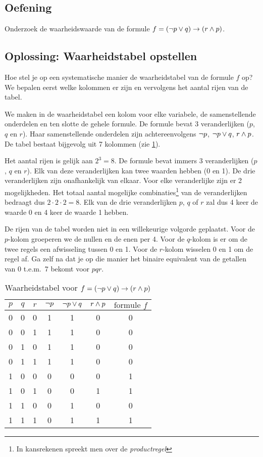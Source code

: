 \subsection{Oefening}
Onderzoek de waarheidswaarde van de formule $f = (\neg p \vee q) \rightarrow (r \wedge p)$.\\

\subsection*{Oplossing: Waarheidstabel opstellen}
Hoe stel je op een systematische manier de waarheidstabel van de formule $f$ op? We bepalen eerst welke kolommen er zijn en vervolgens het aantal rijen van de tabel.

We maken in de waarheidstabel een kolom voor elke variabele, de samenstellende onderdelen en ten slotte de gehele formule. De formule bevat 3 veranderlijken ($p$, $q$ en $r$). Haar samenstellende onderdelen zijn achtereenvolgens $\neg p$, $\neg p \vee q$, $r \wedge p$. De tabel bestaat bijgevolg uit 7 kolommen (zie \cref{tbl:oefdrievar}).

Het aantal rijen is gelijk aan $2^3=8$.  De formule bevat immers 3 veranderlijken ($p$, $q$ en $r$). Elk van deze veranderlijken kan twee waarden hebben (0 en 1). De drie veranderlijken zijn onafhankelijk van elkaar. Voor elke veranderlijke zijn er 2 mogelijkheden. Het totaal aantal mogelijke combinaties\footnote{In kansrekenen spreekt men over de \emph{productregel}} van de veranderlijken bedraagt dus $2 \cdot 2 \cdot 2 = 8$. Elk van de drie veranderlijken $p$, $q$ of $r$ zal dus 4 keer de waarde 0 en 4 keer de waarde 1 hebben.

De rijen van de tabel worden niet in een willekeurige volgorde geplaatst. Voor de $p$-kolom groeperen we de nullen en de enen per 4. Voor de $q$-kolom is er om de twee regels een afwisseling tussen 0 en 1. Voor de $r$-kolom wisselen 0 en 1 om de regel af. Ga zelf na dat je op die manier het binaire equivalent van de getallen van 0 t.e.m.\ 7 bekomt voor $pqr$.
\begin{table}[htb]
  \centering
  \caption{Waarheidstabel voor $f=(\neg p \vee q) \rightarrow (r \wedge p)$}\label{tbl:oefdrievar}
\begin{tabular}{ccccccc}
\toprule
 $p$  & $q$ & $r$ & $\neg p$ & $\neg p \vee q$ & $r \wedge p$ & $\mbox{formule } f$ \\
\midrule
0 & 0 & 0 & 1 & 1 & 0 & 0 \\
0 & 0 & 1 & 1 & 1 & 0 & 0 \\
0 & 1 & 0 & 1 & 1 & 0 & 0 \\
0 & 1 & 1 & 1 & 1 & 0 & 0 \\
1 & 0 & 0 & 0 & 0 & 0 & 1 \\
1 & 0 & 1 & 0 & 0 & 1 & 1 \\
1 & 1 & 0 & 0 & 1 & 0 & 0 \\
1 & 1 & 1 & 0 & 1 & 1 & 1 \\
\bottomrule
\end{tabular}
\end{table}

